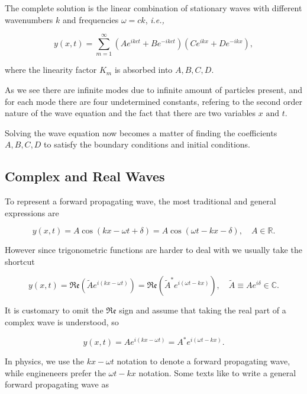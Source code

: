 \documentclass[a4paper,12pt]{report}
\begin{document}
The complete solution is the linear combination of stationary waves with different wavenumbers \(k\) and frequencies \(\omega = ck\), \textit{i.e.,} 

\begin{equation}
	y(x,t) = \sum_{m=1}^{\infty}  \left( Ae^{ik ct}+Be^{-ik ct}    \right)\left( Ce^{i k x}+De^{-i k x}   \right),
\end{equation}

where the linearity factor \(K_{m} \) is absorbed into \(A,B,C,D\). 

As we see there are infinite modes due to infinite amount of particles present, and for each mode there are four undetermined constants, refering to the second order nature of the wave equation and the fact that there are two variables \(x \text { and } t\). 

Solving the wave equation now becomes a matter of finding the coefficients \(A, B, C, D\) to satisfy the boundary conditions and initial conditions. 

\subsection{Complex and Real Waves} \label{explain}

To represent a forward propagating wave, the most traditional and general expressions are

\begin{equation}
	y(x,t) = A\cos (kx-\omega t+\delta ) = A \cos (\omega t - kx - \delta ), \quad A \in \mathbb{R}.
\end{equation}

However since trigonometric functions are harder to deal with we usually take the shortcut 

\begin{equation}
	y(x,t) = \mathfrak{Re} (\tilde{A} e^{i(kx-\omega t)} ) = \mathfrak{Re} (\tilde{A} ^*e^{i(\omega t-kx)} ), \quad  \tilde{A} \equiv  Ae^{i\delta }   \in \mathbb{C}.   
\end{equation}

It is customary to omit the \(\mathfrak{Re} \) sign and assume that taking the real part of a complex wave is understood, so

\begin{equation}
	y(x,t) = Ae^{i(kx-\omega t)} = A^*e^{i(\omega t-kx)}.  
\end{equation}

In physics, we use the \(kx-\omega t\) notation to denote a forward propagating wave, while engineneers prefer the \(\omega t-kx\) notation. Some texts like to write a general forward propagating wave as 
\end{document}
